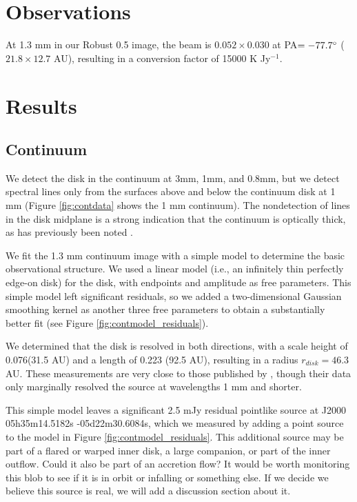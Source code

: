 \documentclass[twocolumn]{aastex61}
\begin{document}
\section{Observations}

At 1.3 mm in our Robust 0.5 image, the beam is $0.052\times0.030$ \arcsec at
PA$=-77.7^{\circ}$ ($21.8\times12.7$ AU), resulting in a 
conversion factor of 15000 K Jy$^{-1}$.

\section{Results}

\subsection{Continuum}
We detect the disk in the continuum at 3mm, 1mm, and 0.8mm, but we detect
spectral lines only from the surfaces above and below the continuum disk at 1
mm (Figure \ref{fig:contdata} shows the 1 mm continuum).  The nondetection of
lines in the disk midplane is a strong indication that the continuum is
optically thick, as has previously been noted
\citep[e.g.][]{Plambeck2016a}.

We fit the 1.3 mm continuum image with a simple model to determine the basic
observational structure.  We used a linear model (i.e., an infinitely thin
perfectly edge-on disk) for the disk, with endpoints and amplitude as free parameters.
This simple model left significant residuals, so we added a two-dimensional
Gaussian smoothing kernel as another three free parameters to obtain a
substantially better fit (see Figure \ref{fig:contmodel_residuals}).

We determined that the disk is resolved in both
directions, with a scale height of 0.076\arcsec (31.5 AU) and a length of 0.223
\arcsec (92.5 AU), resulting in a radius $r_{disk}=46.3$ AU.  These measurements
are very close to those published by \citet{Plambeck2016a}, though their data
only marginally resolved the source at wavelengths 1 mm and shorter.

This simple model leaves a significant 2.5 mJy residual pointlike source at
J2000 05h35m14.5182s -05d22m30.6084s, which we measured by adding a point
source to the model in Figure \ref{fig:contmodel_residuals}.  This additional
source may be part of a flared or warped inner disk, a large companion, or part
of the inner outflow.  Could it also be part of an accretion flow?  It would be
worth monitoring this blob to see if it is in orbit or infalling or something
else.  {\color{red} If we decide we believe this source is real, we will add
a discussion section about it.}
\end{document}
